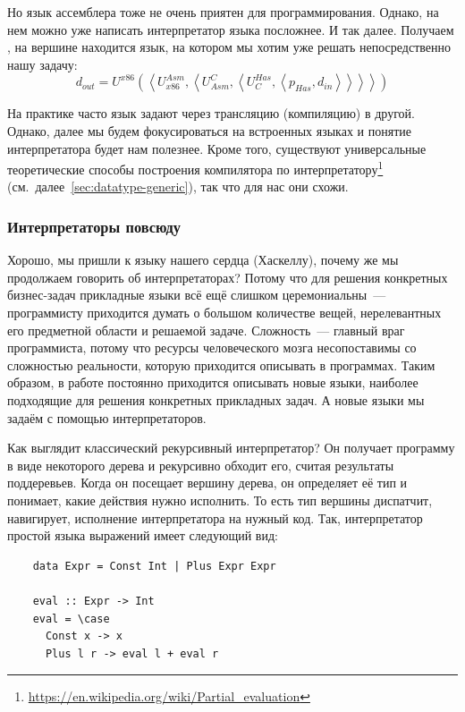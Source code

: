 Но язык ассемблера тоже не очень приятен для программирования.
Однако, на нем можно уже написать интерпретатор языка посложнее.
И так далее.
Получаем , на вершине находится язык, на котором мы хотим уже решать непосредственно нашу задачу:
\[
    d_{out} =
    U^{x86}\left(\left<
                     U_{x86}^{Asm}, \left<
                                        U^C_{Asm}, \left<
                                                       U^{Has}_C, \left< p_{Has}, d_{in}
                \right>\right>\right>\right>\right)
\]

На практике часто язык задают через трансляцию (компиляцию) в другой.
Однако, далее мы будем фокусироваться на встроенных языках и понятие интерпретатора будет нам полезнее.
Кроме того, существуют универсальные теоретические способы построения компилятора по интерпретатору\footnote{\url{https://en.wikipedia.org/wiki/Partial_evaluation}} (см.\ далее\ \ref{sec:datatype-generic}), так что для нас они схожи.

\subsubsection{Интерпретаторы повсюду} \label{subsubsec:interpreters-everywhere}

Хорошо, мы пришли к языку нашего сердца (Хаскеллу), почему же мы продолжаем говорить об интерпретаторах?
Потому что для решения конкретных бизнес-задач прикладные языки всё ещё слишком церемониальны~--- программисту приходится думать о большом количестве вещей, нерелевантных его предметной области и решаемой задаче.
Сложность~--- главный враг программиста, потому что ресурсы человеческого мозга несопоставимы со сложностью реальности, которую приходится описывать в программах.
Таким образом, в работе постоянно приходится описывать новые языки, наиболее подходящие для решения конкретных прикладных задач.
А новые языки мы задаём с помощью интерпретаторов.

Как выглядит классический рекурсивный интерпретатор?
Он получает программу в виде некоторого дерева и рекурсивно обходит его, считая результаты поддеревьев.
Когда он посещает вершину дерева, он определяет её тип и понимает, какие действия нужно исполнить.
То есть тип вершины диспатчит, навигирует, исполнение интерпретатора на нужный код.
Так, интерпретатор простой языка выражений имеет следующий вид:
\begin{verbatim}
    data Expr = Const Int | Plus Expr Expr

    eval :: Expr -> Int
    eval = \case
      Const x -> x
      Plus l r -> eval l + eval r
\end{verbatim}

